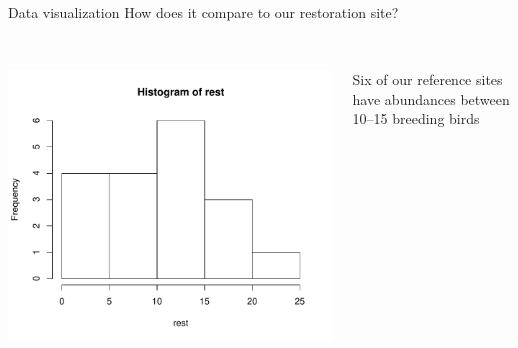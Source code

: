 \documentclass[xcolor=svgnames]{beamer}
\begin{document}
\begin{frame}[fragile]{Data visualization}
How does it compare to our restoration site?\\~\\
\begin{columns}
\begin{column}{0.6\textwidth}
\begin{Schunk}
\end{Schunk}
\begin{center}
\includegraphics[width=\textwidth,trim=0in 0in 0.3in 0.3in]{R_for_data_analysis-hist_rest.pdf}
\end{center}
\end{column}
\begin{column}{0.4\textwidth}
Six of our reference sites have abundances between 10--15 breeding birds
\end{column}
\end{columns}
\end{frame}
\end{document}
